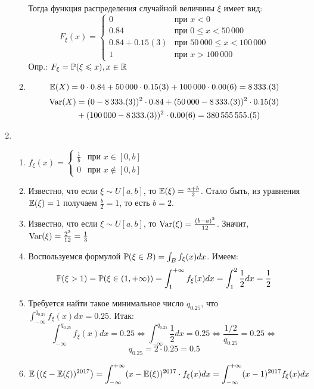 \begin{enumerate}
\begin{enumerate}
Тогда функция распределения случайной величины $\xi$ имеет вид:
\[
F_{\xi} (x) =
\begin{cases}
0 & \text{при } x<0 \\
0.84 & \text{при } 0 \leq x < 50\,000 \\
0.84 + 0.15(3) & \text{при } 50\,000
\leq x < 100\,000 \\
1 & \text{при } x > 100\,000
\end{cases}
\]
Опр.: $F_{\xi} = \P (\xi \leq x ), x \in \mathbb{R}$
\item \[
\E (X) = 0 \cdot 0.84 + 50\,000 \cdot 0.15(3) + 100\,000 \cdot 0.00(6) = 8\,333.(3)
\]
\begin{align*}
\Var(X) &= (0 - 8\,333.(3))^2 \cdot 0.84 + (50\,000-8\,333.(3))^2 \cdot 0.15(3) \\
&+ (100\,000 - 8\,333.(3))^2 \cdot 0.00(6) = 380\,555\,555.(5)
\end{align*}
\end{enumerate}
\item
\begin{enumerate}
\item $ f_{\xi} (x)=
\begin{cases}
\frac{1}{b} & \text{при } x \in [0, b] \\
0 & \text{при } x \notin [0, b]
\end{cases}
$
\item  Известно, что если $\xi \sim U[a, b]$, то $\E (\xi) = \frac{a+b}{2}$. Стало быть, из уравнения $\E (\xi) = 1$ получаем $\frac{b}{2} = 1$,  то есть $b=2$.
\item Известно, что если $\xi \sim U[a, b]$, то $\Var (\xi) = \frac{(b-a)^2}{12}$. Значит, $\Var (\xi) = \frac{2^2}{12} = \frac{1}{3}$
\item Воспользуемся формулой $\P (\xi \in B ) = \int_B f_{\xi} (x) dx$. Имеем:
\[
\P (\xi > 1 ) = \P (\xi \in (1, + \infty) ) = \int_{1}^{+ \infty} f_{\xi} (x) dx = \int_{1}^{2} \frac{1}{2} dx = \frac{1}{2}
\]
\item Требуется найти такое минимальное число $q_{0.25}$, что $\int_{-\infty}^{q_{0.25}} f_{\xi} (x) dx = 0.25$. Итак:
\[
\int_{-\infty}^{q_{0.25}} f_{\xi} (x) dx = 0.25 \Leftrightarrow \int_{-\infty}^{q_{0.25}} \frac{1}{2} dx = 0.25 \Leftrightarrow \frac{1/2}{q_{0.25}} = 0.25 \Leftrightarrow
\]
\[
q_{0.25} = 2 \cdot 0.25 = 0.5
\]
\item
\begin{align*}
\E \left((\xi - \E(\xi))^{2017} \right) &= \int_{-\infty}^{+\infty} (x- \E(\xi) )^{2017} \cdot f_{\xi} (x) dx = \int_{-\infty}^{+\infty} (x-1)^{2017} f_{\xi} (x) dx \\

\end{align*}
\end{enumerate}
\end{enumerate}

